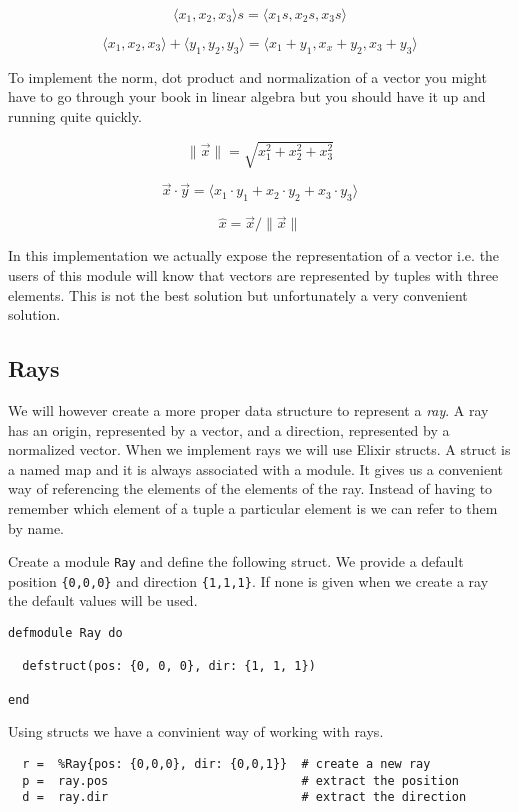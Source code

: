 \documentclass[a4paper,11pt]{article}
\begin{document}
$$\langle x_1, x_2, x_3 \rangle  s =  \langle x_1s, x_2s, x_3s \rangle$$

$$\langle x_1, x_2, x_3 \rangle + \langle y_1, y_2, y_3\rangle = \langle x_1+y_1, x_x+y_2, x_3+y_3 \rangle$$

To implement the norm, dot product and normalization of a vector you
might have to go through your book in linear algebra but you should
have it up and running quite quickly.

$$\|\vec{x}\| = \sqrt{x_1^2 + x_2^2 + x_3^2}$$

$$ \vec{x} \cdot \vec{y} = \langle x_1\cdot y_1 + x_2\cdot y_2 + x_3\cdot y_3\rangle $$ 

$$ \hat{x} = \vec{x}/\|\vec{x}\|$$

In this implementation we actually expose the representation of a
vector i.e. the users of this module will know that vectors are
represented by tuples with three elements. This is not the best
solution but unfortunately a very convenient solution.

\subsection*{Rays}

We will however create a more proper data structure to represent a {\em ray}. 
A ray has an origin, represented by a vector, and a direction,
represented by a normalized vector. When we implement rays we will use
Elixir structs. A struct is a named map and it is always associated with a module. It gives
us a convenient way of referencing the elements of the elements of the ray. Instead
of having to remember which element of a tuple a particular element
is we can refer to them by name. 

Create a module {\tt Ray} and define the following struct. We provide
a default position {\tt \{0,0,0\}} and direction {\tt \{1,1,1\}}. If
none is given when we create a ray the default values will be used.

\begin{verbatim}
defmodule Ray do

  defstruct(pos: {0, 0, 0}, dir: {1, 1, 1})
  
end
\end{verbatim}

Using structs we have a convinient way of working with rays.


\begin{verbatim}
  r =  %Ray{pos: {0,0,0}, dir: {0,0,1}}  # create a new ray
  p =  ray.pos                           # extract the position
  d =  ray.dir                           # extract the direction
\end{verbatim}
\end{document}
